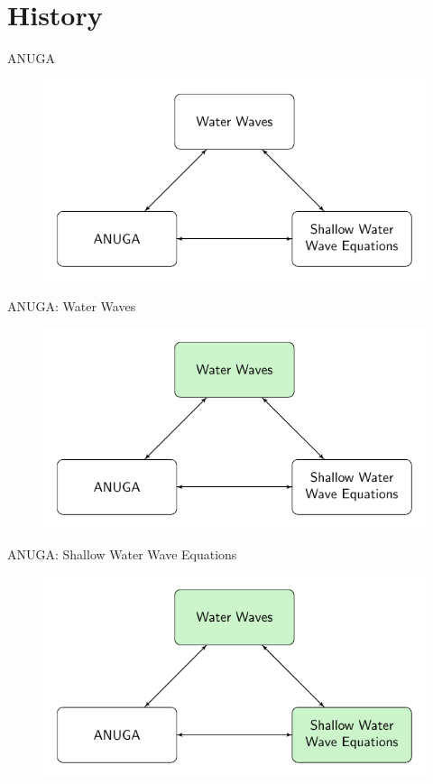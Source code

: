 \documentclass[]{beamer}
\begin{document}
\section{History}
\begin{frame}{ANUGA}
	\begin{figure}
		\includegraphics[width=\textwidth]{./Pics/ModelDiagrams/FlowChartANUGA.pdf}
	\end{figure}
\end{frame}

\begin{frame}{ANUGA: Water Waves}
	\begin{figure}
		\includegraphics[width=\textwidth]{./Pics/ModelDiagrams/FlowChartANUGA1G.pdf}
	\end{figure}
\end{frame}

\begin{frame}{ANUGA: Shallow Water Wave Equations}
	\begin{figure}
		\includegraphics[width=\textwidth]{./Pics/ModelDiagrams/FlowChartANUGA12G.pdf}
	\end{figure}
\end{frame}
\end{document}
